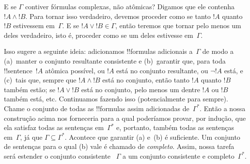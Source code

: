 \documentclass[../../../include/open-logic-section]{subfiles}
\begin{document}
E se $\Gamma$ contiver fórmulas complexas, não atômicas? Digamos que ele
contenha $!A \land !B$. Para tornar isso verdadeiro, devemos proceder como se
tanto $!A$ quanto $!B$ estivessem em~$\Gamma$.  E se $!A \lor !B \in \Gamma$,
então teremos que tornar pelo menos um deles verdadeiro, isto é, proceder como
se um deles estivesse em~$\Gamma$.

Isso sugere a seguinte ideia: adicionamos !!{formula}s adicionais
a~$\Gamma$ de modo a (a)~manter o conjunto resultante consistente e
(b)~garantir que, para toda !!{sentence}~$!A$ atômica possível,
ou $!A$ está no conjunto resultante, ou $\lnot !A$ está, e (c)~tais que,
sempre que $!A \land !B$ está no conjunto, então tanto $!A$ quanto $!B$
também estão; se $!A \lor !B$ está no conjunto, pelo menos um dentre $!A$
ou $!B$ também está, etc.  Continuamos fazendo isso (potencialmente para
sempre).  Chame o conjunto de todas as
!!{formula}s assim adicionadas de~$\Gamma^*$.  Então a nossa construção acima
nos forneceria 
para a qual poderíamos provar, por indução, que ela satisfaz todas as sentenças
em~$\Gamma^*$ e, portanto, também todas as sentenças em~$\Gamma$,
já que $\Gamma \subseteq \Gamma^*$.  Acontece que garantir (a)
e~(b) é suficiente. Um conjunto de sentenças para o qual (b) vale é chamado de
\emph{completo}. Assim, nossa tarefa será estender o conjunto consistente
~$\Gamma$ a um conjunto consistente e completo~$\Gamma^*$.
\end{document}
